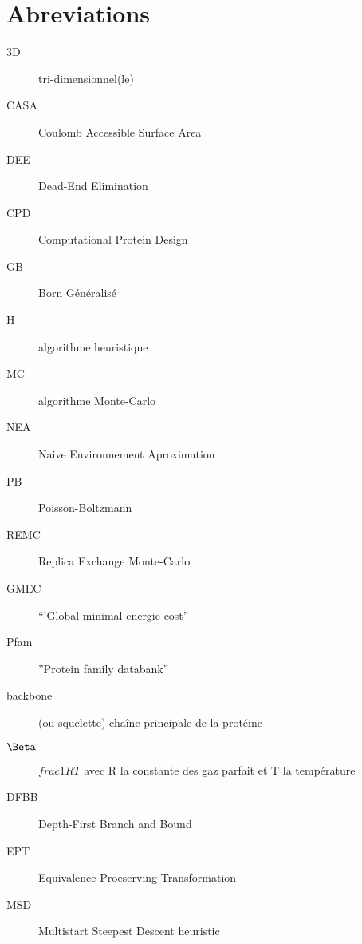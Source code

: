 \chapter*{Abreviations}

\begin{multicols}{2}

\begin{description}
\item[3D] tri-dimensionnel(le)
\item [CASA] Coulomb Accessible Surface Area
\item [DEE] Dead-End Elimination 
\item[CPD] Computational Protein Design
\item [GB] Born Généralisé
\item[H] algorithme heuristique
\item[MC] algorithme Monte-Carlo
\item[NEA] Naive Environnement Aproximation
\item [PB] Poisson-Boltzmann
\item [REMC] Replica Exchange Monte-Carlo
\item[GMEC] ``'Global minimal energie cost''
\item[Pfam] ''Protein family databank''
\item[backbone]  (ou squelette) chaîne principale de la protéine
\item [$\Beta$]  $frac{1}{RT}$ avec R la constante des gaz parfait et T la température
\item [DFBB] Depth-First Branch and Bound
\item [EPT] Equivalence Proeserving Transformation
\item [MSD] Multistart Steepest Descent heuristic  
\end{description}

\end{multicols}

